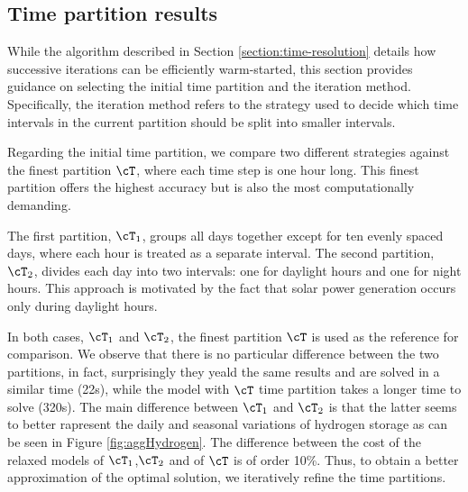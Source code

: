 \documentclass[english]{article}
\numberwithin{definition}{section}
\numberwithin{theorem}{section}
\numberwithin{problem}{section}
\begin{document}
\subsection{Time partition results}
While the algorithm described in Section \ref{section:time-resolution} details how successive iterations can be efficiently warm-started, this section provides guidance on selecting the initial time partition and the iteration method. Specifically, the iteration method refers to the strategy used to decide which time intervals in the current partition should be split into smaller intervals.

Regarding the initial time partition, we compare two different strategies against the finest partition \(\cT\), where each time step is one hour long. This finest partition offers the highest accuracy but is also the most computationally demanding.

The first partition, \(\cT_1\), groups all days together except for ten evenly spaced days, where each hour is treated as a separate interval. The second partition, \(\cT_2\), divides each day into two intervals: one for daylight hours and one for night hours. This approach is motivated by the fact that solar power generation occurs only during daylight hours.

In both cases, \(\cT_1\) and \(\cT_2\), the finest partition \(\cT\) is used as the reference for comparison.
We observe that there is no particular difference between the two partitions, in fact, surprisingly they yeald the same results and are solved in a similar time (22s), while the model with \(\cT\) time partition takes a longer time to solve (320s).
The main difference between \(\cT_1\) and \(\cT_2\) is that the latter seems to better rapresent the daily and seasonal variations of hydrogen storage as can be seen in Figure \ref{fig:aggHydrogen}. The difference between the cost of the relaxed models of \(\cT_1\),\(\cT_2\) and of \(\cT\) is of order 10\%.
Thus, to obtain a better approximation of the optimal solution, we iteratively refine the time partitions.
\end{document}
